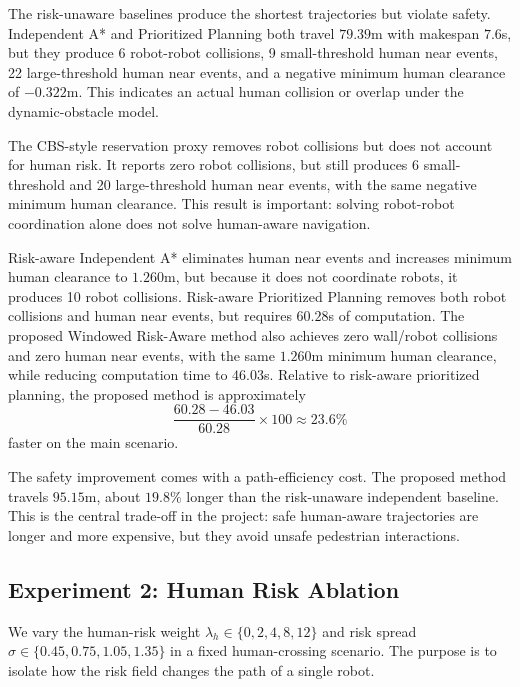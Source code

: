 \documentclass[10pt,twocolumn,letterpaper]{article}
\begin{document}
The risk-unaware baselines produce the shortest trajectories but violate safety. Independent A* and Prioritized Planning both travel $79.39$m with makespan $7.6$s, but they produce 6 robot-robot collisions, 9 small-threshold human near events, 22 large-threshold human near events, and a negative minimum human clearance of $-0.322$m. This indicates an actual human collision or overlap under the dynamic-obstacle model.

The CBS-style reservation proxy removes robot collisions but does not account for human risk. It reports zero robot collisions, but still produces 6 small-threshold and 20 large-threshold human near events, with the same negative minimum human clearance. This result is important: solving robot-robot coordination alone does not solve human-aware navigation.

Risk-aware Independent A* eliminates human near events and increases minimum human clearance to $1.260$m, but because it does not coordinate robots, it produces 10 robot collisions. Risk-aware Prioritized Planning removes both robot collisions and human near events, but requires $60.28$s of computation. The proposed Windowed Risk-Aware method also achieves zero wall/robot collisions and zero human near events, with the same $1.260$m minimum human clearance, while reducing computation time to $46.03$s. Relative to risk-aware prioritized planning, the proposed method is approximately
\begin{equation}
    \frac{60.28 - 46.03}{60.28} \times 100 \approx 23.6\%
\end{equation}
faster on the main scenario.

The safety improvement comes with a path-efficiency cost. The proposed method travels $95.15$m, about $19.8\%$ longer than the risk-unaware independent baseline. This is the central trade-off in the project: safe human-aware trajectories are longer and more expensive, but they avoid unsafe pedestrian interactions.

\subsection{Experiment 2: Human Risk Ablation}
We vary the human-risk weight $\lambda_h \in \{0,2,4,8,12\}$ and risk spread $\sigma \in \{0.45,0.75,1.05,1.35\}$ in a fixed human-crossing scenario. The purpose is to isolate how the risk field changes the path of a single robot.

\begin{table}[t]
    \centering
    \caption{Risk-field ablation over human-risk weight and Gaussian risk spread. Insert \texttt{results/0615\_results/risk\_ablation\_metrics.csv}.}
    \label{tab:risk_ablation}
\end{table}
\end{document}
